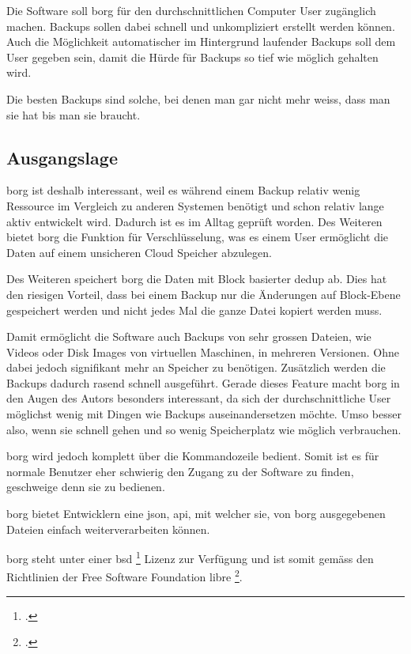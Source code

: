 Die Software soll \gls{borg} für den durchschnittlichen Computer User zugänglich
machen. Backups sollen dabei schnell und unkompliziert erstellt werden können.
Auch die Möglichkeit automatischer im Hintergrund laufender Backups soll dem
User gegeben sein, damit die Hürde für Backups so tief wie möglich gehalten
wird.

Die besten Backups sind solche, bei denen man gar nicht mehr weiss, dass man sie
hat bis man sie braucht.

\subsection{Ausgangslage}
\label{sec:org65d9768}

\gls{borg} ist deshalb interessant, weil es während einem Backup relativ
wenig Ressource im Vergleich zu anderen Systemen benötigt und schon relativ
lange aktiv entwickelt wird. Dadurch ist es im Alltag geprüft worden.
Des Weiteren bietet \gls{borg} die Funktion für Verschlüsselung, was es einem User
ermöglicht die Daten auf einem unsicheren Cloud Speicher abzulegen.

Des Weiteren speichert \gls{borg} die Daten mit Block basierter \gls{dedup} ab. Dies
hat den riesigen Vorteil, dass bei einem Backup nur die Änderungen auf
Block-Ebene gespeichert werden und nicht jedes Mal die ganze Datei kopiert
werden muss.

Damit ermöglicht die Software auch Backups von sehr grossen Dateien, wie Videos
oder Disk Images von virtuellen Maschinen, in mehreren Versionen. Ohne dabei
jedoch signifikant mehr an Speicher zu benötigen. Zusätzlich werden die Backups
dadurch rasend schnell ausgeführt. Gerade dieses Feature macht \gls{borg} in den
Augen des Autors besonders interessant, da sich der durchschnittliche User
möglichst wenig mit Dingen wie Backups auseinandersetzen möchte. Umso besser
also, wenn sie schnell gehen und so wenig Speicherplatz wie möglich verbrauchen.

\gls{borg} wird jedoch komplett über die Kommandozeile bedient. Somit ist es für
normale Benutzer eher schwierig den Zugang zu der Software zu finden, geschweige
denn sie zu bedienen.

\gls{borg} bietet Entwicklern eine \gls{json}, \gls{api}, mit welcher sie, von \gls{borg}
ausgegebenen Dateien einfach weiterverarbeiten können.

\gls{borg} steht unter einer \gls{bsd} \footcite{bsd} Lizenz zur Verfügung und ist
somit gemäss den Richtlinien der Free Software Foundation
\gls{libre} \footcite{fsflicenses}.

